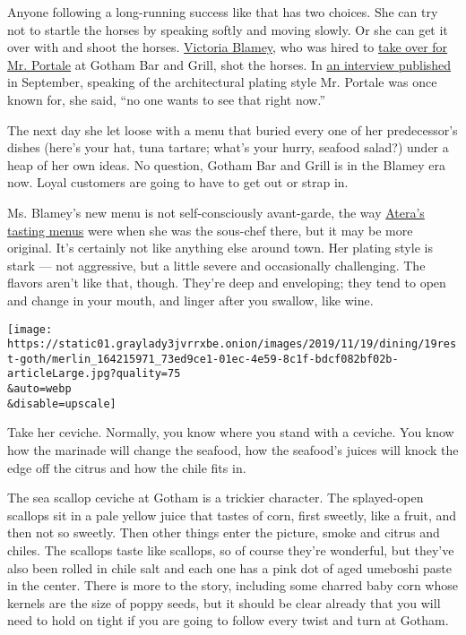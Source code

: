 Anyone following a long-running success like that has two choices. She
can try not to startle the horses by speaking softly and moving slowly.
Or she can get it over with and shoot the horses.
\href{https://www.victoriablamey.com/}{Victoria Blamey}, who was hired
to
\href{https://www.nytimes3xbfgragh.onion/2019/07/23/dining/gotham-bar-and-grill-chef-victoria-blamey.html}{take
over for Mr. Portale} at Gotham Bar and Grill, shot the horses. In
\href{https://www.nytimes3xbfgragh.onion/2019/09/03/dining/gotham-bar-and-grill-victoria-blamey.html}{an
interview published} in September, speaking of the architectural plating
style Mr. Portale was once known for, she said, ``no one wants to see
that right now.''

The next day she let loose with a menu that buried every one of her
predecessor's dishes (here's your hat, tuna tartare; what's your hurry,
seafood salad?) under a heap of her own ideas. No question, Gotham Bar
and Grill is in the Blamey era now. Loyal customers are going to have to
get out or strap in.

Ms. Blamey's new menu is not self-consciously avant-garde, the way
\href{https://www.nytimes3xbfgragh.onion/2012/07/18/dining/reviews/atera-in-tribeca.html}{Atera's
tasting menus} were when she was the sous-chef there, but it may be more
original. It's certainly not like anything else around town. Her plating
style is stark --- not aggressive, but a little severe and occasionally
challenging. The flavors aren't like that, though. They're deep and
enveloping; they tend to open and change in your mouth, and linger after
you swallow, like wine.

\texttt{[image: https://static01.graylady3jvrrxbe.onion/images/2019/11/19/dining/19rest-goth/merlin\_164215971\_73ed9ce1-01ec-4e59-8c1f-bdcf082bf02b-articleLarge.jpg?quality=75\\\&auto=webp\\\&disable=upscale]}

Take her ceviche. Normally, you know where you stand with a ceviche. You
know how the marinade will change the seafood, how the seafood's juices
will knock the edge off the citrus and how the chile fits in.

The sea scallop ceviche at Gotham is a trickier character. The
splayed-open scallops sit in a pale yellow juice that tastes of corn,
first sweetly, like a fruit, and then not so sweetly. Then other things
enter the picture, smoke and citrus and chiles. The scallops taste like
scallops, so of course they're wonderful, but they've also been rolled
in chile salt and each one has a pink dot of aged umeboshi paste in the
center. There is more to the story, including some charred baby corn
whose kernels are the size of poppy seeds, but it should be clear
already that you will need to hold on tight if you are going to follow
every twist and turn at Gotham.

